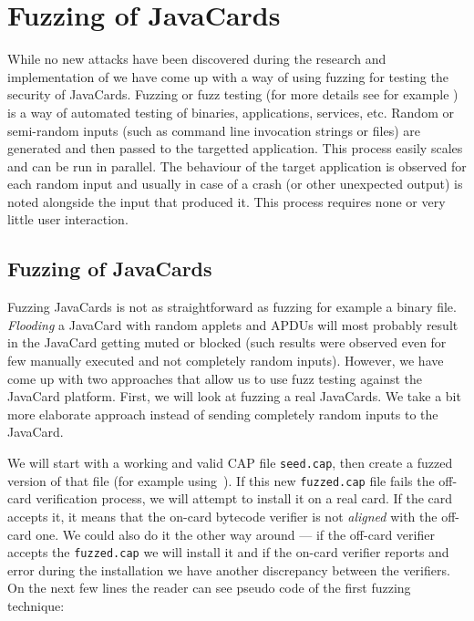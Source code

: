 \documentclass{../llncs/llncs}
\begin{document}
\section{Fuzzing of JavaCards\label{sec:fuzzing}}
While no new attacks have been discovered during the research and implementation of \projectname we have come up with a way of using fuzzing for testing the security of JavaCards. Fuzzing or fuzz testing (for more details see for example \cite{ossfuzz}) is a way of automated testing of binaries, applications, services, etc. Random or semi-random inputs (such as command line invocation strings or files) are generated and then passed to the targetted application. This process easily scales and can be run in parallel. The behaviour of the target application is observed for each random input and usually in case of a crash (or other unexpected output) is noted alongside the input that produced it. This process requires none or very little user interaction.

    \subsection{Fuzzing of JavaCards}
    Fuzzing JavaCards is not as straightforward as fuzzing for example a binary file. \textit{Flooding} a JavaCard with random applets and APDUs will most probably result in the JavaCard getting muted or blocked (such results were observed even for few manually executed and not completely random inputs). However, we have come up with two approaches that allow us to use fuzz testing against the JavaCard platform. First, we will look at fuzzing a real JavaCards. We take a bit more elaborate approach instead of sending completely random inputs to the JavaCard.

    We will start with a working and valid CAP file \texttt{seed.cap}, then create a fuzzed version of that file (for example using~\cite{radamsa}). If this new \texttt{fuzzed.cap} file fails the off-card verification process, we will attempt to install it on a real card. If the card accepts it, it means that the on-card bytecode verifier is not \textit{aligned} with the off-card one. We could also do it the other way around --- if the off-card verifier accepts the \texttt{fuzzed.cap} we will install it and if the on-card verifier reports and error during the installation we have another discrepancy between the verifiers. On the next few lines the reader can see pseudo code of the first fuzzing technique:
\end{document}
